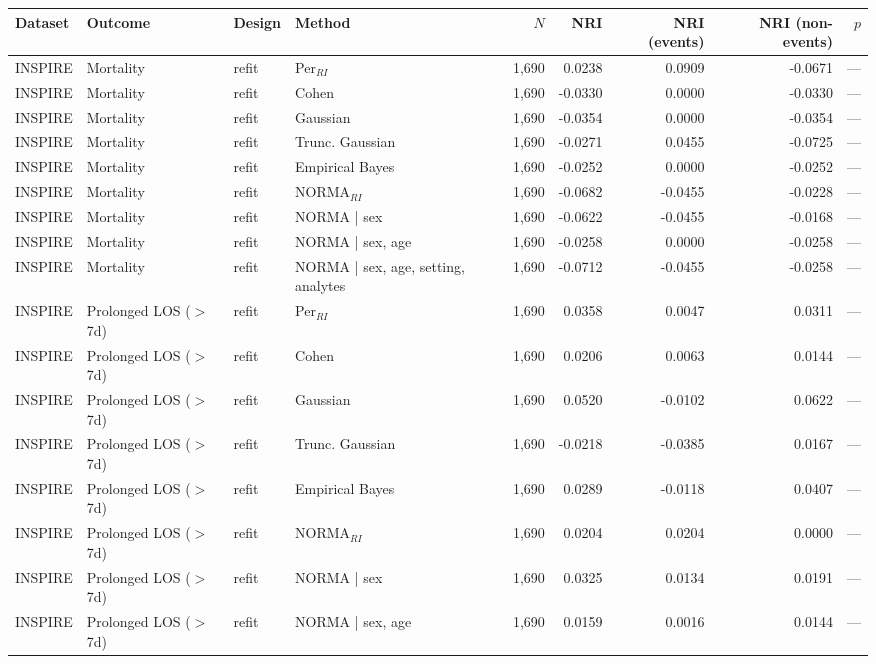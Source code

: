 \begin{table}[ht]
\centering
\footnotesize
\begin{tabular}{ll l l r r r r r}
\toprule
Dataset & Outcome & Design & Method & $N$ & NRI & NRI (events) & NRI (non-events) & $p$ \\
\midrule
INSPIRE & Mortality & refit & Per$_{RI}$ & 1,690 & 0.0238 & 0.0909 & -0.0671 & --- \\
INSPIRE & Mortality & refit & Cohen & 1,690 & -0.0330 & 0.0000 & -0.0330 & --- \\
INSPIRE & Mortality & refit & Gaussian & 1,690 & -0.0354 & 0.0000 & -0.0354 & --- \\
INSPIRE & Mortality & refit & Trunc. Gaussian & 1,690 & -0.0271 & 0.0455 & -0.0725 & --- \\
INSPIRE & Mortality & refit & Empirical Bayes & 1,690 & -0.0252 & 0.0000 & -0.0252 & --- \\
INSPIRE & Mortality & refit & NORMA$_{RI}$ & 1,690 & -0.0682 & -0.0455 & -0.0228 & --- \\
INSPIRE & Mortality & refit & NORMA | sex & 1,690 & -0.0622 & -0.0455 & -0.0168 & --- \\
INSPIRE & Mortality & refit & NORMA | sex, age & 1,690 & -0.0258 & 0.0000 & -0.0258 & --- \\
INSPIRE & Mortality & refit & NORMA | sex, age, setting, analytes & 1,690 & -0.0712 & -0.0455 & -0.0258 & --- \\
INSPIRE & Prolonged LOS ($>$7d) & refit & Per$_{RI}$ & 1,690 & 0.0358 & 0.0047 & 0.0311 & --- \\
INSPIRE & Prolonged LOS ($>$7d) & refit & Cohen & 1,690 & 0.0206 & 0.0063 & 0.0144 & --- \\
INSPIRE & Prolonged LOS ($>$7d) & refit & Gaussian & 1,690 & 0.0520 & -0.0102 & 0.0622 & --- \\
INSPIRE & Prolonged LOS ($>$7d) & refit & Trunc. Gaussian & 1,690 & -0.0218 & -0.0385 & 0.0167 & --- \\
INSPIRE & Prolonged LOS ($>$7d) & refit & Empirical Bayes & 1,690 & 0.0289 & -0.0118 & 0.0407 & --- \\
INSPIRE & Prolonged LOS ($>$7d) & refit & NORMA$_{RI}$ & 1,690 & 0.0204 & 0.0204 & 0.0000 & --- \\
INSPIRE & Prolonged LOS ($>$7d) & refit & NORMA | sex & 1,690 & 0.0325 & 0.0134 & 0.0191 & --- \\
INSPIRE & Prolonged LOS ($>$7d) & refit & NORMA | sex, age & 1,690 & 0.0159 & 0.0016 & 0.0144 & --- \\

\end{tabular}
\end{table}
